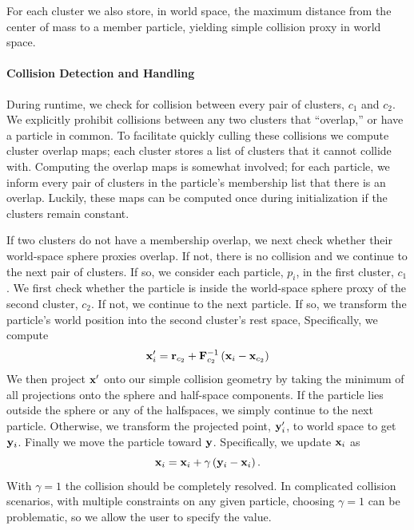 \documentclass[review]{acmsiggraph}
\begin{document}
For each cluster we also store, in world space, the maximum distance from the center of mass to a member particle, yielding simple
collision proxy in world space.

\paragraph{Collision Detection and Handling}
During runtime, we check for collision between every pair of clusters, $c_1$ and $c_2$.  We explicitly prohibit collisions between
any two clusters that ``overlap,'' or have a particle in common.  To facilitate quickly culling these collisions
we compute cluster overlap maps; each cluster stores
a list of clusters that it cannot collide with.  Computing the overlap maps is somewhat involved; for each particle,
we inform every pair of clusters in the particle's membership list that there is an overlap.
Luckily, these maps can be computed once during initialization if the clusters remain constant.

If two clusters do not have a membership overlap, we next check whether their world-space sphere proxies overlap.  If not, 
there is no collision and we continue to the next pair of clusters.  If so, we consider each particle, $p_i$, in the
first cluster, $c_1$.  We first check whether the particle is inside the world-space sphere proxy of the second cluster, $c_2$.  If not, 
we continue to the next particle.  If so, we transform the particle's world position into the second cluster's rest space,
Specifically, we compute
\begin{equation}
\mathit{\mathbf{x}}_i^\prime = \mathit{\mathbf{r}}_{c_2} + \mathit{\mathbf{F}}_{c_2}^{-1}\left(\mathit{\mathbf{x}}_i - \mathit{\mathbf{x}}_{c_2}\right)
\end{equation}
We then project $\mathit{\mathbf{x}}^\prime$ onto our simple collision
geometry by taking the minimum of all projections onto the sphere and half-space components.  If the particle lies outside the
sphere or any of the halfspaces, we simply continue to the next particle.  Otherwise, we transform the projected point, $\mathit{\mathbf{y}}_i^\prime$,
to world space to get $\mathit{\mathbf{y}}_i$.  Finally we move the particle toward $\mathit{\mathbf{y}}$.  
Specifically, we update $\mathit{\mathbf{x}}_i$ as
\begin{equation}
\mathit{\mathbf{x}}_i = \mathit{\mathbf{x}}_i + \gamma\left(\mathit{\mathbf{y}}_i-\mathit{\mathbf{x}}_i\right).
\end{equation}
With $\gamma=1$ the collision should be completely resolved.  In complicated collision scenarios, with multiple constraints on any given
particle, choosing $\gamma=1$ can be problematic, so we allow the user to specify the value.
\end{document}
